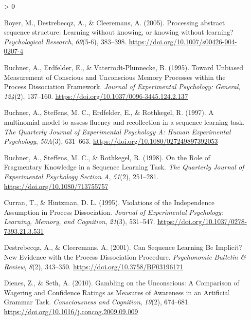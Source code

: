 \documentclass[
  english,
  man]{apa6}
\newlength{\cslhangindent}
\newenvironment{CSLReferences}[2] %
 {%
  \setlength{\parindent}{0pt}
  \ifodd #1 \everypar{\setlength{\hangindent}{\cslhangindent}}\ignorespaces\fi
  \ifnum #2 > 0
  \setlength{\parskip}{#2\baselineskip}
  \fi
 }%
 {}
\begin{document}
\hypertarget{refs}{}
\begin{CSLReferences}{1}{0}
\leavevmode\hypertarget{ref-boyer_processing_2005}{}%
Boyer, M., Destrebecqz, A., \& Cleeremans, A. (2005). Processing abstract sequence structure: Learning without knowing, or knowing without learning? \emph{Psychological Research}, \emph{69}(5-6), 383--398. \url{https://doi.org/10.1007/s00426-004-0207-4}

\leavevmode\hypertarget{ref-buchner_unbiased_1995}{}%
Buchner, A., Erdfelder, E., \& Vaterrodt-Plünnecke, B. (1995). Toward {Unbiased Measurement} of {Conscious} and {Unconscious Memory Processes} within the {Process Dissociation Framework}. \emph{Journal of Experimental Psychology: General}, \emph{124}(2), 137--160. \url{https://doi.org/10.1037/0096-3445.124.2.137}

\leavevmode\hypertarget{ref-buchner_multinomial_1997}{}%
Buchner, A., Steffens, M. C., Erdfelder, E., \& Rothkegel, R. (1997). A multinomial model to assess fluency and recollection in a sequence learning task. \emph{The Quarterly Journal of Experimental Psychology A: Human Experimental Psychology}, \emph{50A}(3), 631--663. \url{https://doi.org/10.1080/027249897392053}

\leavevmode\hypertarget{ref-buchner_role_1998}{}%
Buchner, A., Steffens, M. C., \& Rothkegel, R. (1998). On the {Role} of {Fragmentary Knowledge} in a {Sequence Learning Task}. \emph{The Quarterly Journal of Experimental Psychology Section A}, \emph{51}(2), 251--281. \url{https://doi.org/10.1080/713755757}

\leavevmode\hypertarget{ref-curran_violations_1995}{}%
Curran, T., \& Hintzman, D. L. (1995). Violations of the {Independence Assumption} in {Process Dissociation}. \emph{Journal of Experimental Psychology: Learning, Memory, and Cognition}, \emph{21}(3), 531--547. \url{https://doi.org/10.1037/0278-7393.21.3.531}

\leavevmode\hypertarget{ref-destrebecqz_can_2001}{}%
Destrebecqz, A., \& Cleeremans, A. (2001). Can {Sequence Learning Be Implicit}? {New Evidence} with the {Process Dissociation Procedure}. \emph{Psychonomic Bulletin \& Review}, \emph{8}(2), 343--350. \url{https://doi.org/10.3758/BF03196171}

\leavevmode\hypertarget{ref-dienes_gambling_2010}{}%
Dienes, Z., \& Seth, A. (2010). Gambling on the {Unconscious}: {A Comparison} of {Wagering} and {Confidence Ratings} as {Measures} of {Awareness} in an {Artificial Grammar Task}. \emph{Consciousness and Cognition}, \emph{19}(2), 674--681. \url{https://doi.org/10.1016/j.concog.2009.09.009}


\end{CSLReferences}
\end{document}

